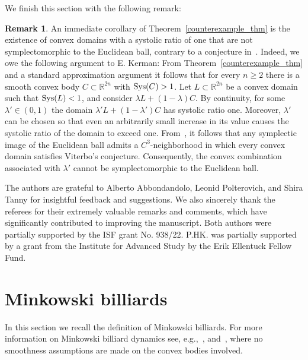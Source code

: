 \documentclass[10pt,a4paper]{article}
\theoremstyle{definition}
\newtheorem{remark}[theorem]{Remark}
\begin{document}
\medskip

We finish this section with the following  remark: 

\begin{remark}
An immediate corollary of Theorem~\ref{counterexample_thm} is the existence of convex domains with a systolic ratio of one that are not symplectomorphic to the Euclidean ball, contrary to a conjecture in~\cite{viterbo2000}. Indeed, we owe the following argument to E. Kerman: From Theorem~\ref{counterexample_thm}  and a standard approximation argument it follows that for every $n \geq 2$ there is a smooth convex body $C \subset {\mathbb R}^{2n}$ with ${\rm Sys}(C) > 1$.
Let $L \subset {\mathbb R}^{2n}$ be a convex domain such that ${\rm Sys}(L) < 1$,
and consider $\lambda L + (1 - \lambda)C$. 
By continuity, for some $\lambda' \in (0,1)$ 
the domain $\lambda' L + (1-\lambda')C$ has systolic ratio one. 
Moreover, \(\lambda'\) can be chosen so that even an arbitrarily small increase in its value causes the systolic ratio of the domain to exceed one.  
From~\cite[Corollary 2]{abbondandoloBenedetti}, it follows that any symplectic image of the Euclidean ball admits a \(C^3\)-neighborhood in which every convex domain satisfies Viterbo’s conjecture.  
Consequently, the convex combination associated with \(\lambda'\) cannot be symplectomorphic to the Euclidean ball.
\end{remark} 


\medskip 


 The authors are grateful to Alberto Abbondandolo, Leonid Polterovich, and Shira Tanny for insightful feedback and suggestions. We also sincerely thank the referees for their extremely valuable remarks and comments, which have significantly contributed to improving the manuscript. Both authors were partially supported by the ISF grant No. 938/22. 
P.HK. was partially supported by a grant from the Institute for Advanced Study by the Erik Ellentuck Fellow Fund.

\section{Minkowski billiards}  \label{Section-Mink-Bill}

In this section we recall the definition of Minkowski billiards. 
For more information on Minkowski billiard dynamics see, e.g.,~\cite{AA-O,GutTab},
and~\cite{Mink-Bill-Rudolf}, where no smoothness assumptions are made on the convex bodies involved.
\end{document}
